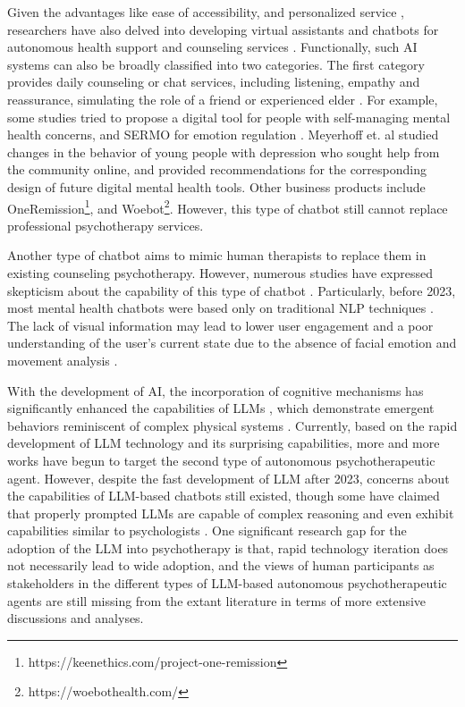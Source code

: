 Given the advantages like ease of accessibility, and personalized service \citep{habicht2024closing}, researchers have also delved into developing virtual assistants and chatbots for autonomous health support \citep{richards2023principlist,nicol2022chatbot} and counseling services \citep{srivastava2023response}. Functionally, such AI systems can also be broadly classified into two categories. The first category provides daily counseling or chat services, including listening, empathy and reassurance, simulating the role of a friend or experienced elder \citep{xu2022survey,valtolina2021design}. For example, some studies \citep{harilal2020caro, kornfield2022meeting} tried to propose a digital tool for people with self-managing mental health concerns, and SERMO for emotion regulation \citep{denecke2020mental}. Meyerhoff et. al \citep{meyerhoff2022meeting} studied changes in the behavior of young people with depression who sought help from the community online, and provided recommendations for the corresponding design of future digital mental health tools. Other business products include OneRemission\footnote{https://keenethics.com/project-one-remission}, and Woebot\footnote{https://woebothealth.com/}. However, this type of chatbot still cannot replace professional psychotherapy services.

Another type of chatbot aims to mimic human therapists to replace them in existing counseling psychotherapy. However, numerous studies have expressed skepticism about the capability of this type of chatbot \citep{xu2022survey,brown2021ai}. Particularly, before 2023, most mental health chatbots were based only on traditional NLP techniques \citep{laranjo2018conversational}. The lack of visual information may lead to lower user engagement and a poor understanding of the user's current state due to the absence of facial emotion and movement analysis \citep{miner2019key}. 

With the development of AI, the incorporation of cognitive mechanisms has significantly enhanced the capabilities of LLMs \citep{binz2023turning}, which demonstrate emergent behaviors reminiscent of complex physical systems \citep{wei2022emergent}. Currently, based on the rapid development of LLM technology and its surprising capabilities, more and more works \citep{nie2024llm,chiu2024computational} have begun to target the second type of autonomous psychotherapeutic agent. However, despite the fast development of LLM after 2023, concerns about the capabilities of LLM-based chatbots \citep{grodniewicz2023waiting,floridi2023ai} still existed, though some have claimed that properly prompted LLMs are capable of complex reasoning \citep{wei2022chain} and even exhibit capabilities similar to psychologists \citep{ullman2023large}. One significant research gap for the adoption of the LLM into psychotherapy is that, rapid technology iteration does not necessarily lead to wide adoption, and the views of human participants as stakeholders in the different types of LLM-based autonomous psychotherapeutic agents are still missing from the extant literature in terms of more extensive discussions and analyses.




